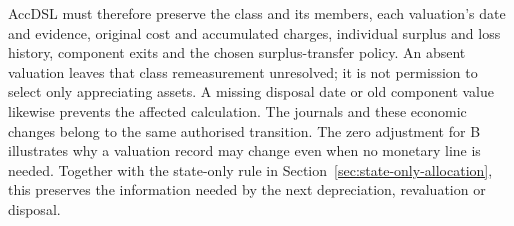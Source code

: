 AccDSL must therefore preserve the class and its members, each valuation's
date and evidence, original cost and accumulated charges, individual surplus
and loss history, component exits and the chosen surplus-transfer policy.
An absent valuation leaves that class remeasurement unresolved; it is not
permission to select only appreciating assets. A missing disposal date or
old component value likewise prevents the affected calculation. The journals
and these economic changes belong to the same authorised transition. The
zero adjustment for B illustrates why a valuation record may change even
when no monetary line is needed. Together with the state-only rule in
Section~\ref{sec:state-only-allocation}, this preserves the information needed
by the next depreciation, revaluation or disposal.
